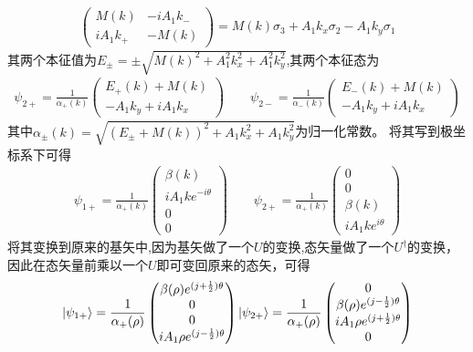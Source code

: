 \documentclass[22pt]{article}
\begin{document}
	\begin{align}
		\begin{pmatrix}
			M(k) &-iA_1k_{-}\\
			iA_1k_{+} &-M(k)
		\end{pmatrix}
		=M(k)\sigma_3+A_1k_x\sigma_2-A_1k_y\sigma_1
	\end{align}
	其两个本征值为$E_{\pm}=\pm\sqrt{M(k)^2+A_1^2k_x^2+A_1^2k_y^2}$,其两个本征态为
	\begin{align}
		\psi_{2+}=\frac{1}{\alpha_{+}(k)}
		\begin{pmatrix}
			E_{+}(k)+M(k)\\
			-A_1k_y+iA_1k_x
		\end{pmatrix}
		\qquad
		\psi_{2-}=\frac{1}{\alpha_{-}(k)}
		\begin{pmatrix}
			E_{-}(k)+M(k)\\
			-A_1k_y+iA_1k_x
		\end{pmatrix}
	\end{align}
	其中$\alpha_{\pm}(k)=\sqrt{(E_{\pm}+M(k))^2+A_1k_x^2+A_1k_y^2}$为归一化常数。
	将其写到极坐标系下可得
	\begin{align}
		\psi_{1+}=\frac{1}{\alpha_{+}(k)}
		\begin{pmatrix}
			\beta(k)\\
			iA_1ke^{-i\theta}\\
			0\\
			0
		\end{pmatrix}
		\qquad
		\psi_{2+}=
		\frac{1}{\alpha_{+}(k)}
		\begin{pmatrix}
			0\\
			0\\
			\beta(k)\\
			iA_1ke^{i\theta}
		\end{pmatrix}
	\end{align}
	将其变换到原来的基矢中,因为基矢做了一个$U$的变换,态矢量做了一个$U^{\dagger}$的变换，因此在态矢量前乘以一个$U$即可变回原来的态矢，可得
	\begin{align}
		\ket{\psi_{1+}}=\frac{1}{\alpha_{+}(\rho)}
		\begin{pmatrix}
			\beta(\rho)e^{(j+\frac{1}{2})\theta}\\
			0
			\\
		0\\
				iA_1\rho e^{(j-\frac{1}{2})\theta}
		\end{pmatrix}
		\ket{\psi_{2+}}=\frac{1}{\alpha_{+}(\rho)}
		\begin{pmatrix}
			0\\
			\beta(\rho)e^{(j-\frac{1}{2})\theta}\\
			iA_1\rho e^{(j+\frac{1}{2})\theta}
			\\
			0
		\end{pmatrix}
	\end{align}
\end{document}
